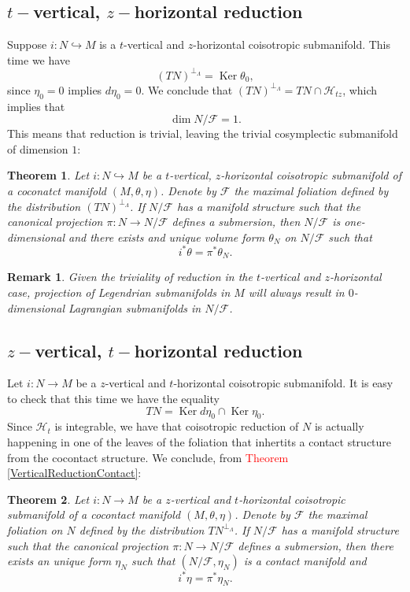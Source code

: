 \documentclass[12pt]{article}
\newtheorem{theorem}{Theorem}[section]
\newtheorem{remark}{Remark}[section]
\renewcommand{\dim}{\operatorname{dim}}
\renewcommand{\ker}{\operatorname{Ker}}
\begin{document}
\subsection{\texorpdfstring{$t-$}-vertical, \texorpdfstring{$z-$}-horizontal reduction}
Suppose $i: N \hookrightarrow M$ is a $t$-vertical and $z$-horizontal coisotropic submanifold. This time we have $$(TN)^{\perp_\Lambda} = \ker \theta_0,$$ since $\eta_0 = 0$ implies $d\eta _0 = 0$. We conclude that $(TN)^{\perp_\Lambda} = TN \cap \mathcal{H}_{tz}$, which implies that $$\dim N/\mathcal{F} = 1.$$ This means that reduction is trivial, leaving the trivial cosymplectic submanifold of dimension $1$:\\
\begin{theorem} Let $i: N \hookrightarrow M$ be a $t$-vertical, $z$-horizontal coisotropic submanifold of a coconatct manifold $(M , \theta, \eta)$. Denote by $\mathcal{F}$ the maximal foliation defined by the distribution $(TN)^{\perp_\Lambda}$. If $N/\mathcal{F}$ has a manifold structure such that the canonical projection $\pi: N \rightarrow N/\mathcal{F}$ defines a submersion, then $N/\mathcal{F}$ is one-dimensional and there exists and unique volume form $\theta_N$ on $N/\mathcal{F}$ such that $$i^* \theta = \pi^* \theta_N.$$
\end{theorem}

\begin{remark}{\rm Given the triviality of reduction in the $t$-vertical and $z$-horizontal case, projection of Legendrian submanifolds in $M$ will always result in $0$-dimensional Lagrangian submanifolds in $N/\mathcal{F}$. }
\end{remark}

\subsection{\texorpdfstring{$z-$}-vertical, \texorpdfstring{$t-$}-horizontal reduction} 
Let $i: N \rightarrow M$ be a $z$-vertical and $t$-horizontal coisotropic submanifold. It is easy to check that this time we have the equality 
$$TN = \ker d\eta_0 \cap \ker \eta_0.$$
Since $\mathcal{H}_t$ is integrable, we have that coisotropic reduction of $N$ is actually happening in one of the leaves of the foliation that inhertits a contact structure from the cocontact structure. We conclude, from \textcolor{red}{Theorem \ref{VerticalReductionContact}}:\\

\begin{theorem} Let $i: N \rightarrow M$ be a $z$-vertical and $t$-horizontal coisotropic submanifold of a cocontact manifold $(M, \theta, \eta)$. Denote by $\mathcal{F}$ the maximal foliation on $N$ defined by the distribution $TN^{\perp_\Lambda}$. If $N/\mathcal{F}$ has a manifold structure such that the canonical projection $\pi: N \rightarrow N/\mathcal{F}$ defines a submersion, then there exists an unique form $\eta_N$ such that $(N/\mathcal{F}, \eta_N)$ is a contact manifold and $$i^*\eta = \pi^* \eta_N.$$
\end{theorem}
\end{document}
